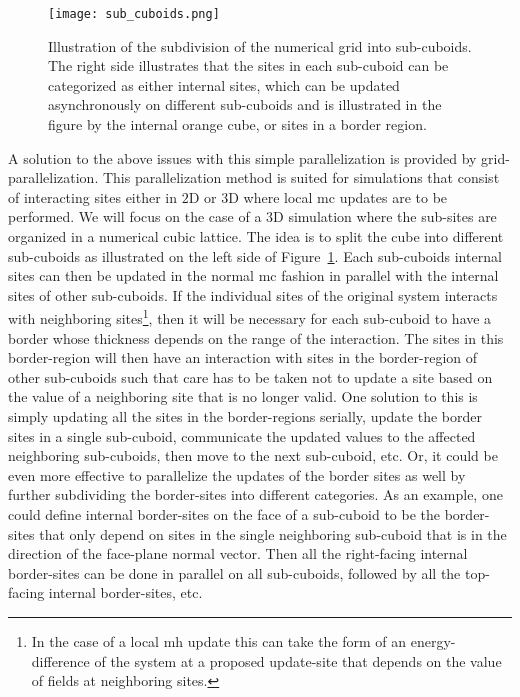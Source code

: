 \begin{figure}[t]
    \centering
    \texttt{[image: sub\_cuboids.png]}
    \caption{Illustration of the subdivision of the numerical grid into sub-cuboids. The right side illustrates that the sites in each sub-cuboid
    can be categorized as either internal sites, which can be updated asynchronously on different sub-cuboids and is illustrated in the figure
    by the internal orange cube, or sites in a border region.}
    \label{fig:Monte:numerical_grid}
\end{figure}

A solution to the above issues with this simple parallelization is provided by grid-parallelization. This parallelization method is suited for
simulations that consist of interacting sites either in $2$D or $3$D where local \ac{mc} updates are to be performed.
We will focus on the case of a $3$D simulation where the sub-sites
are organized in a numerical cubic lattice. The idea is to split the cube into different sub-cuboids as illustrated on the left side of
Figure~\ref{fig:Monte:numerical_grid}. Each sub-cuboids internal sites can then
be updated in the normal \ac{mc} fashion in parallel with the internal sites of other sub-cuboids. If the individual sites of the original
system interacts with neighboring sites\footnote{In the case of a local \ac{mh} update this can take the form of an energy-difference of
the system at a proposed update-site that depends on the value of fields at neighboring sites.}, then it will be necessary for each sub-cuboid to have
a border whose thickness depends on the range of the interaction. The sites in this border-region will then have an interaction with sites in
the border-region of other sub-cuboids such that care has to be taken not to update a site based on the value of a neighboring site that is no
longer valid. One solution to this is simply updating all the sites in the border-regions serially, \ie update the border sites in a single sub-cuboid,
communicate the updated values to the affected neighboring sub-cuboids, then move to the next sub-cuboid, etc. Or, it could be even more effective
to parallelize the updates of the border sites as well by further subdividing the border-sites into different categories. As an example, one could
define internal border-sites on the face of a sub-cuboid to be the border-sites that only depend on sites in the single neighboring sub-cuboid that
is in the direction of the face-plane normal vector. Then all the right-facing internal border-sites can be done in parallel on all sub-cuboids, followed
by all the top-facing internal border-sites, etc.

